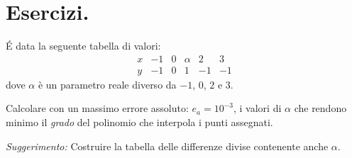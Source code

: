 \begin{comment}

\begin{codice}
\begin{verbatim}

\end{verbatim}
\end{codice}

\end{comment}

\chapter{Esercizi.}

\begin{ese}
\'E data la seguente tabella di valori:
\[
\begin{array}{cccccc}
x & -1 & 0 & \alpha & 2 & 3 \\
y & -1 & 0 & 1 & -1 & -1
\end{array}
\]
dove $\alpha$ è un parametro reale diverso da $-1$, $0$, $2$ e $3$.

Calcolare con un massimo errore assoluto: $e_a = 10^{-3}$, i valori di 
$\alpha$ che rendono minimo il \emph{grado} del polinomio che interpola 
i punti assegnati.

\begin{flushleft}\emph{Suggerimento:} Costruire la tabella delle differenze
divise contenente anche $\alpha$.
\end{flushleft}
\end{ese}
